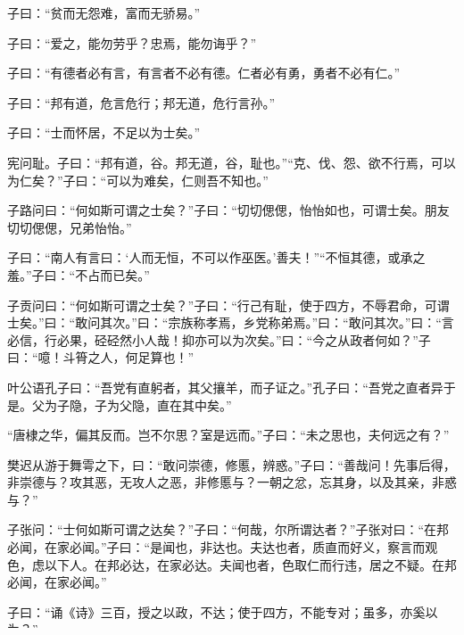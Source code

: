 \documentclass[a5paper]{ctexbook}
\begin{document}
    子曰：“贫而无怨难，富而无骄易。”

    子曰：“爱之，能勿劳乎？忠焉，能勿诲乎？”

    子曰：“有德者必有言，有言者不必有德。仁者必有勇，勇者不必有仁。”

    子曰：“邦有道，危言危行；邦无道，危行言孙。”

    子曰：“士而怀居，不足以为士矣。”

    宪问耻。子曰：“邦有道，谷。邦无道，谷，耻也。”“克、伐、怨、欲不行焉，可以为仁矣？”子曰：“可以为难矣，仁则吾不知也。”

    子路问曰：“何如斯可谓之士矣？”子曰：“切切偲偲，怡怡如也，可谓士矣。朋友切切偲偲，兄弟怡怡。”

    子曰：“南人有言曰：‘人而无恒，不可以作巫医。’善夫！”“不恒其德，或承之羞。”子曰：“不占而已矣。”

    子贡问曰：“何如斯可谓之士矣？”子曰：“行己有耻，使于四方，不辱君命，可谓士矣。”曰：“敢问其次。”曰：“宗族称孝焉，乡党称弟焉。”曰：“敢问其次。”曰：“言必信，行必果，硁硁然小人哉！抑亦可以为次矣。”曰：“今之从政者何如？”子曰：“噫！斗筲之人，何足算也！”

    叶公语孔子曰：“吾党有直躬者，其父攘羊，而子证之。”孔子曰：“吾党之直者异于是。父为子隐，子为父隐，直在其中矣。”

    “唐棣之华，偏其反而。岂不尔思？室是远而。”子曰：“未之思也，夫何远之有？”

    樊迟从游于舞雩之下，曰：“敢问崇德，修慝，辨惑。”子曰：“善哉问！先事后得，非崇德与？攻其恶，无攻人之恶，非修慝与？一朝之忿，忘其身，以及其亲，非惑与？”

    子张问：“士何如斯可谓之达矣？”子曰：“何哉，尔所谓达者？”子张对曰：“在邦必闻，在家必闻。”子曰：“是闻也，非达也。夫达也者，质直而好义，察言而观色，虑以下人。在邦必达，在家必达。夫闻也者，色取仁而行违，居之不疑。在邦必闻，在家必闻。”

    子曰：“诵《诗》三百，授之以政，不达；使于四方，不能专对；虽多，亦奚以为？”

    子曰：“听讼，吾犹人也。必也使无讼乎！”

    冉子退朝。子曰：“何晏也？”对曰：“有政。”子曰：“其事也。如有政，虽不吾以，吾其与闻之。”

    子张问崇德辨惑。子曰：“主忠信，徙义，崇德也。爱之欲其生，恶之欲其死。既欲其生，又欲其死，是惑也。‘诚不以富，亦祇以异。’”

    子张问明。子曰：“浸润之谮，肤受之愬，不行焉，可谓明也已矣。浸润之谮，肤受之愬，不行焉，可谓远也已矣。”
\end{document}
